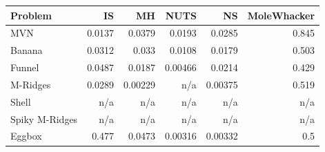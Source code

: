 \begin{tabular}{lrrrrr}
\toprule
Problem & IS & MH & NUTS & NS & MoleWhacker \\
\midrule
MVN & 0.0137 & 0.0379 & 0.0193 & 0.0285 & 0.845 \\
Banana & 0.0312 & 0.033 & 0.0108 & 0.0179 & 0.503 \\
Funnel & 0.0487 & 0.0187 & 0.00466 & 0.0214 & 0.429 \\
M-Ridges & 0.0289 & 0.00229 & n/a & 0.00375 & 0.519 \\
Shell & n/a & n/a & n/a & n/a & n/a \\
Spiky M-Ridges & n/a & n/a & n/a & n/a & n/a \\
\midrule
Eggbox & 0.477 & 0.0473 & 0.00316 & 0.00332 & 0.5 \\
\bottomrule
\end{tabular}
